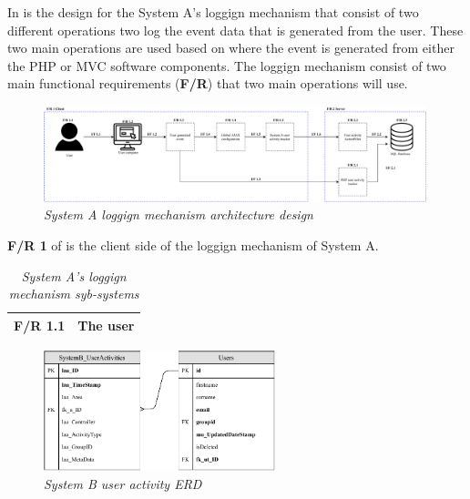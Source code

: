 In  is the design for the System A's loggign mechanism that consist of two different operations two log the event data that is generated from the user. These two main operations are used based on where the event is generated from either the PHP or MVC software components. The loggign mechanism consist of two main functional requirements (\textbf{F/R}) that two main operations will use.

\begin{figure}[!htb] %
	\centering %
	\includegraphics[width=0.99\textwidth]{Images/Chapter2/SystemA_Architecture_Diagram/SystemA_Architecture_Diagram.pdf}
	\caption[System A loggign mechanism architecture design]
	{\textit{System A loggign mechanism architecture design}}\label{fig:SystemA_Arch_Design}
\end{figure}

\textbf{F/R 1} of  is the client side of the loggign mechanism of System A.

\begin{table}[!htb]
	\centering
	\small
	\caption[System A's loggign mechanism syb-systems]
	{\textit{System A's loggign mechanism syb-systems}}
	\label{tbl:SystemA_SubSystems}
	\begin{tabularx}{\textwidth}{|l|X|}
		\hline \textbf{F/R 1.1} & The user \\
		\hline
	\end{tabularx}
\end{table}

\clearpage

\begin{figure}[!htb] %
	\centering %
	\includegraphics[width=0.6\textwidth]{Images/Chapter2/SystemB_ERD_Basic/SystemB_ERD_Basic.pdf}
	\caption[System B user activity ERD]
	{\textit{System B user activity ERD}}\label{fig:SystemB_Basic_ERD}
\end{figure}

